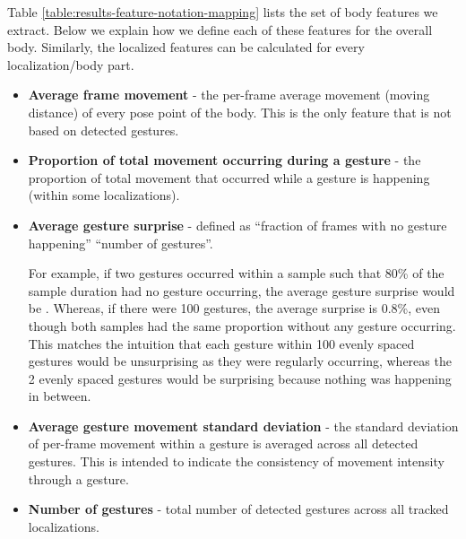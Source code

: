 Table \ref{table:results-feature-notation-mapping} lists the set of body features we extract. Below we explain how we define each of these features for the overall body. Similarly, the localized features can be calculated for every localization/body part.
\begin{itemize}\item \textbf{Average frame movement} - the per-frame average movement (moving distance) of every pose point of the body. This is the only feature that is not based on detected gestures.
  \item \textbf{Proportion of total movement occurring during a gesture} - the proportion of total
  movement that occurred while a gesture is happening (within some localizations).
  \item \textbf{Average gesture surprise} - 
  defined as 
  ``fraction of frames with no gesture happening''  ``number of gestures''.




  For example, if two gestures occurred within a sample such that 80\% of the sample
  duration had no gesture occurring, the average gesture surprise would be .
  Whereas, if there were 100 gestures, 
the average surprise is 0.8\%, even though both samples had the same proportion without
  any gesture occurring.
  This matches the intuition that each gesture within 100 evenly spaced gestures would be unsurprising
  as they were regularly occurring, whereas the 2 evenly spaced gestures would be surprising because
  nothing was happening in between.
\item \textbf{Average gesture movement standard deviation} - the standard deviation of per-frame
  movement within a gesture is averaged across all detected gestures.
  This is intended to indicate the consistency of movement intensity
  through a gesture.
  \item \textbf{Number of gestures} - total number of detected gestures across all tracked localizations.




\end{itemize}
